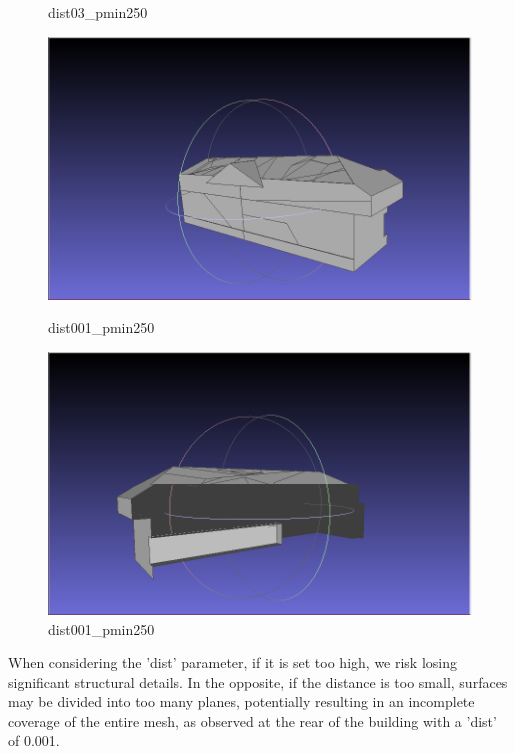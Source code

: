 \documentclass{article}
\begin{document}
\begin{itemize}
\begin{figure}[H]
\begin{minipage}[b]{0.45\textwidth}
      \caption{dist03\_pmin250}
      \label{fig:dist03_pmin250}
    \end{minipage}
    \hfill
    \begin{minipage}[b]{0.45\textwidth}

        \includegraphics[width=\textwidth]{../../images/screen_kinetic/dist_001_pmin_250.png}
        \caption{dist001\_pmin250}
        \label{fig:dist1_pmin300}
      \end{minipage}
    \begin{minipage}[b]{0.45\textwidth}

        \includegraphics[width=\textwidth]{../../images/screen_kinetic/back_dist001_pmin250.png}
        \caption{dist001\_pmin250}
        \label{fig:dist1_pmin300}
      \end{minipage}
  \end{figure}


  When considering the 'dist' parameter, if it is set too high, we risk losing significant structural details. 
  In the opposite, if the distance is too small, surfaces may be divided into too many planes, potentially resulting in an incomplete coverage of the entire mesh, 
  as observed at the rear of the building with a 'dist' of 0.001.


\end{itemize}
\end{document}
